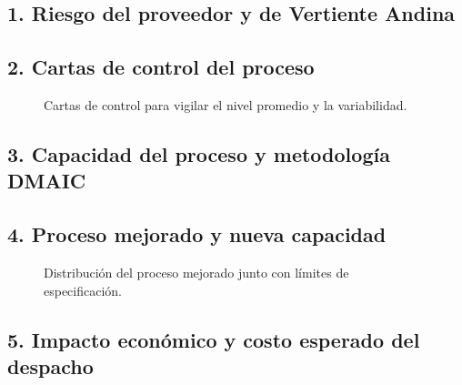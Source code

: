 \subsection*{1. Riesgo del proveedor y de Vertiente Andina}

\subsection*{2. Cartas de control del proceso}

\begin{figure}[H]
    \centering
    \caption{Cartas de control para vigilar el nivel promedio y la variabilidad.}
\end{figure}

\subsection*{3. Capacidad del proceso y metodología DMAIC}

\subsection*{4. Proceso mejorado y nueva capacidad}

\begin{figure}[H]
    \centering
    \caption{Distribución del proceso mejorado junto con límites de especificación.}
\end{figure}

\subsection*{5. Impacto económico y costo esperado del despacho}

